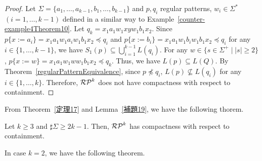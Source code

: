 
\begin{proof}
    Let $\Sigma =\{a_{1},\ldots,a_{k-1},b_{1},\ldots,b_{k-1}\}$ and
    $p, q_{i}$ regular patterns, $w_{i} \in \Sigma^{\ast}$\ $(i=1,\ldots,k-1)$
    defined in a similar way to Example~\ref{counter-example4Theorem10}. %
    Let $q_{k}=x_{1}a_{1}w_{1}xyw_{1}b_{1}x_{2}$.
    Since
    $p\{x:=a_{i}\} = x_{1}a_{1}w_{1}a_{i}w_{1}b_{1}x_{2} \preceq q_{i}$ and
    $p\{x:=b_{i}\} = x_{1}a_{1}w_{1}b_{i}w_{1}b_{1}x_{2} \preceq q_{i}$
    for any $i \in \{1,\ldots,k-1\}$,
    we have $S_{1}(p) \subseteq \bigcup_{i=1}^{k-1}L(q_{i})$.
    For any $w \in \{s \in \Sigma^{+} \mid |s| \geq 2\}$,
    $p\{x:=w\}=x_{1}a_{1}w_{1}ww_{1}b_{1}x_{2} \preceq q_{k}$.
    Thus, we have $L(p) \subseteq L(Q)$.
    By Theorem~\ref{regularPatternEquivalence},
    since $p \not \preceq q_{i}$, $L(p) \not \subseteq L(q_{i})$
    for any $i \in \{1,\ldots, k\}$.
    Therefore, $\mathcal{RP}^{k}$ does not have compactness with respect to containment.
\end{proof}

From Theorem~\ref{定理17} and Lemma~\ref{補題19},
we have the following thorem.


\begin{thm}
    Let $k \geq 3$ and $\sharp\Sigma \geq 2k-1$.
    Then, $\mathcal{RP}^{k}$ has compactness with respect to containment.
\end{thm}

In case $k=2$, we have the following theorem.


